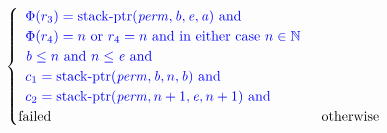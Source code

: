 \documentclass[a4paper]{article}
\newcommand{\tand}{\text{ and }}
\newcommand{\tor}{\text{ or }}
\newcommand{\totherwise}{\text{otherwise }}
\newcommand{\sourcecolor}[1]{\color{blue}}
\newcommand{\src}[1]{{\sourcecolor{} #1}}
\newcommand{\nats}{\mathbb{N}}
\newcommand{\perm}{\var{perm}}
\newcommand{\stkptr}[1]{\mathrm{stack\text{-}ptr}(#1)}
\newcommand{\failed}{\mathrm{failed}}
\newcommand{\var}[1]{\mathit{#1}}
\newcommand{\baddr}{\var{b}}
\newcommand{\eaddr}{\var{e}}
\newcommand{\aaddr}{\var{a}}
\begin{document}
\begin{align*}
\begin{cases}
                                 \begin{array}[t]{l}
                                   \src{\Phi(r_3) = \stkptr{\perm,\baddr,\eaddr,\aaddr} \tand} \\
                                   \src{\Phi(r_4) = n \tor r_4 = n \text{ and in either case } n \in \nats} \\
                                   \src{\baddr \leq n \tand n \leq \eaddr \tand} \\
                                   \src{c_1 = \stkptr{\perm,\baddr,n,\baddr} \tand} \\
                                   \src{c_2 = \stkptr{\perm,n+1,\eaddr,n+1} \tand} 
                                 \end{array}\\
                                 \failed & \totherwise
                               \end{cases}
\end{align*}
\end{document}
